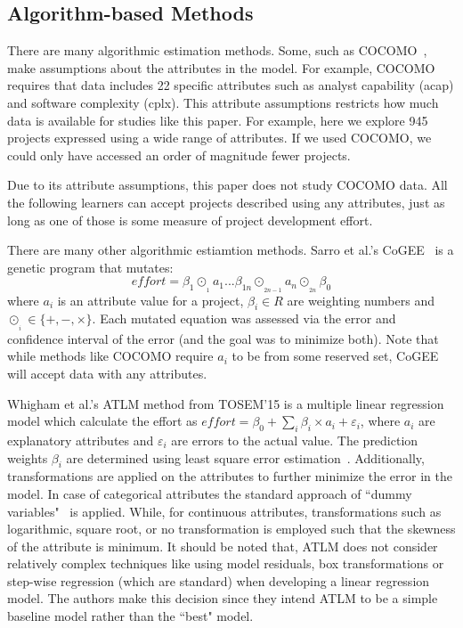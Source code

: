 
\subsection{Algorithm-based Methods}
\label{sec:3}

There are many  algorithmic estimation methods. Some, such as COCOMO~\cite{boehm1981software}, make assumptions
about the  attributes in the model. For example, COCOMO requires that 
data includes 22 specific   attributes such as analyst capability (acap) and software complexity (cplx).  This   attribute
assumptions restricts how much data is available for studies like this paper. 
For example,
here we explore 945 projects expressed using a  wide range of  attributes.  If we used COCOMO, we could only have accessed an order of magnitude   fewer projects. 

Due to its attribute assumptions, this paper does not study COCOMO data. 
All the following learners can accept projects described using any attributes, just as long as one of those is some measure of project development effort.

There are many other algorithmic estiamtion methods.
Sarro et al.'s CoGEE~\cite{sarro2016multi} is a genetic program
that mutates: 
\[\mathit{effort} = \beta_1 \odot_{_{1}} a_1  ... \beta_{1n} \odot_{_{2n-1}} a_n  \odot_{_{2n}} \beta_0\]
where $a_i$ is an attribute value for a project,  $\beta_i \in R$ are weighting numbers and
\mbox{$\odot_{_{i}}\in \{+,-,\times\}$}. Each mutated equation was assessed via the error and confidence interval of the error (and the goal was to minimize both). Note that while methods like COCOMO require $a_i$ to be from some reserved set, 
CoGEE will accept data with any attributes.



Whigham et al.'s ATLM method from TOSEM'15 is a multiple linear regression model which calculate the effort as $\mathit{effort} = \beta_0 + \sum_i\beta_i\times a_{i} +  \varepsilon_i$,  where $a_i$ are explanatory attributes and $\varepsilon_i$ are errors to the actual value. The prediction weights $\beta_i$ are determined using least square error estimation~\cite{neter1996applied}. Additionally, transformations are applied on the attributes to further minimize the error in the model. In case of categorical attributes the standard approach of ``dummy variables"~\cite{hardy1993regression} is applied. While, for continuous attributes, transformations such as logarithmic, square root,  or no transformation is employed such that the skewness of the attribute is minimum. It should be noted that, ATLM does not consider relatively complex techniques like using model residuals,  box transformations or step-wise regression (which are standard) when developing a linear regression model. The authors make this decision since they intend ATLM to be a simple baseline model rather than the ``best" model.


